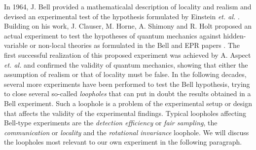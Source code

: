 \smallskip

In 1964, J. Bell provided a mathematicalal description of locality and realism and devised an experimental test of the hypothesis formulated by Einstein {\it et. al.} \citep{bell_einstein_1964}. Building on his work, J. Clauser, M. Horne, A. Shimony and R. Holt proposed an actual experiment to test the hypotheses of quantum mechanics against hidden-variable or non-local theories as formulated in the Bell and EPR papers \cite{clauser_proposed_1969}. The first successful realization of this proposed experiment was achieved by A. Aspect {\it et. al.} \cite{aspect_experimental_1982} and confirmed the validity of quantum mechanics, showing that either the assumption of realism or that of locality must be false. In the following decades, several more experiments have been performed to test the Bell hypothesis, trying to close several so-called {\it loopholes} that can put in doubt the results obtained in a Bell experiment. Such a loophole is a problem of the experimental setup or design that affects the validity of the experimental findings. Typical loopholes affecting Bell-type experiments are the {\it detection efficiency} or {\it fair sampling}, the {\it communication} or {\it locality} and the {\it rotational invariance} loophole. We will discuss the loopholes most relevant to our own experiment in the following paragraph.

\smallskip


